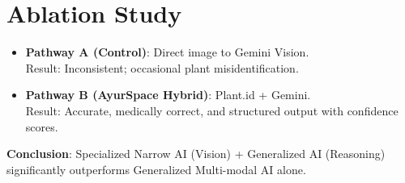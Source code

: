 \vspace{-8pt}
\section{Ablation Study}
\begin{itemize}[itemsep=2pt, topsep=4pt]
    \item \textbf{Pathway A (Control)}: Direct image to Gemini Vision.\\
    Result: Inconsistent; occasional plant misidentification.
    \item \textbf{Pathway B (AyurSpace Hybrid)}: Plant.id + Gemini.\\
    Result: Accurate, medically correct, and structured output with confidence scores.
\end{itemize}
\textbf{Conclusion}: Specialized Narrow AI (Vision) + Generalized AI (Reasoning)
significantly outperforms Generalized Multi-modal AI alone.
